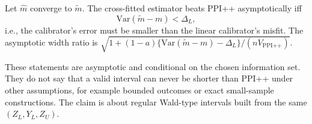 \begin{corollary}
\label{cor:learned}
Let $\hat m$ converge to $\tilde m$. The cross-fitted estimator beats PPI++ asymptotically iff
\[
\mathrm{Var}(\tilde m-m)<\Delta_L,
\]
i.e., the calibrator's error must be smaller than the linear calibrator's misfit. The asymptotic width ratio is $\sqrt{1+(1-a)\{\mathrm{Var}(\tilde m-m)-\Delta_L\}/(nV_{\mathrm{PPI}\text{++}})}$.
\end{corollary}

These statements are asymptotic and conditional on the chosen information set. They do not say that a valid interval can never be shorter than PPI++ under other assumptions, for example bounded outcomes or exact small-sample constructions. The claim is about regular Wald-type intervals built from the same $(Z_L,Y_L,Z_U)$.

